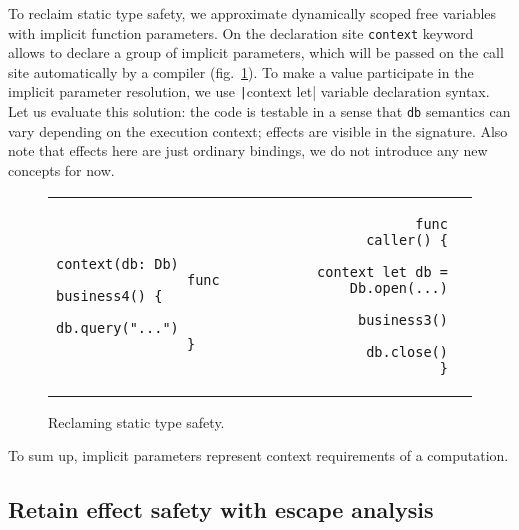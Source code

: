 \documentclass[acmsmall]{acmart}
\begin{document}
To reclaim static type safety, we approximate dynamically scoped free variables with implicit function parameters. %
On the declaration site \texttt{context} keyword allows to declare a group of implicit parameters, which will be passed on the call site automatically by a compiler (fig.\ \ref{fig:implicits}).
To make a value participate in the implicit parameter resolution, we use \texttt|context let| variable declaration syntax.
Let us evaluate this solution: the code is testable in a sense that \texttt{db} semantics can vary depending on the execution context; effects are visible in the signature.
Also note that effects here are just ordinary bindings, we do not introduce any new concepts for now.

\begin{figure}
    \begin{tabular}{p{} rl}
        \begin{minipage}[t]{0.3\textwidth}
            \begin{verbatim}
                context(db: Db)
                func business4() {
                    db.query("...")
                }
            \end{verbatim}
        \end{minipage}
        &
        \begin{minipage}[t]{0.3\textwidth}
            \begin{verbatim}
                func caller() {
                    context let db = Db.open(...)
                    business3()
                    db.close()
                }
            \end{verbatim}
        \end{minipage}
    \end{tabular}
    \caption{Reclaming static type safety.}
    \label{fig:implicits}
\end{figure}


To sum up, implicit parameters represent context requirements of a computation.

\subsection{Retain effect safety with escape analysis} \label{subsec:escape}



%
\end{document}
